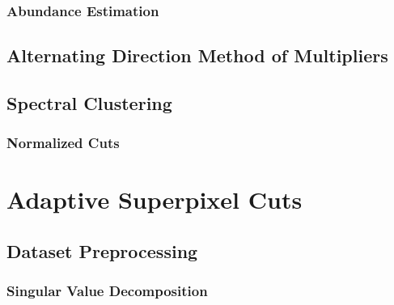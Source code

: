 \documentclass[10pt]{article}
\begin{document}
\subsubsection{Abundance Estimation}\label{AE}


\clearpage
\subsection{Alternating Direction Method of Multipliers}\label{ADMM Intro}

%  

\clearpage
\subsection{Spectral Clustering} \label{Spectral Clustering}

\subsubsection{Normalized Cuts} \label{Normalized Cuts}


\clearpage
% 
% 
% 
% 
% 
\section{Adaptive Superpixel Cuts} \label{Algorithm Intro}


\clearpage
\subsection{Dataset Preprocessing} \label{Algorithm Preprocessing}

\subsubsection{Singular Value Decomposition} \label{SVD}

\end{document}
